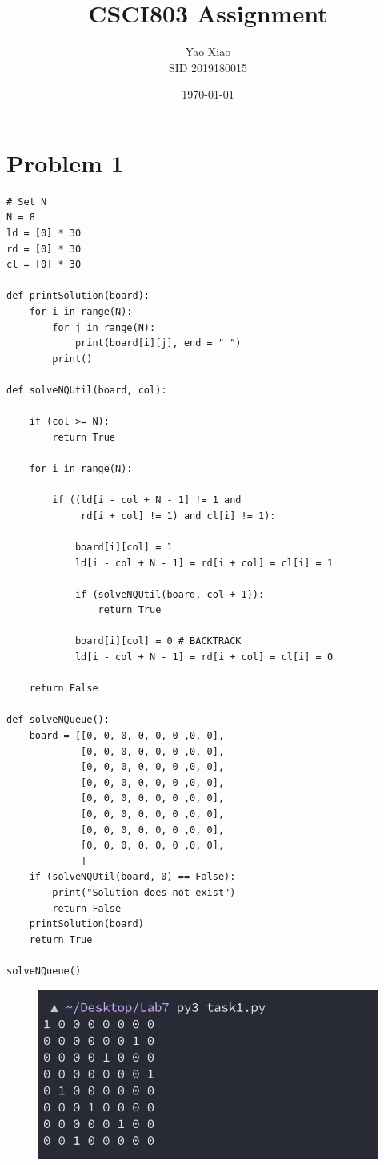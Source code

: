 \documentclass{article}
\title{CSCI803 Assignment}
\author{Yao Xiao \\ SID 2019180015}
\date{\today}
\begin{document}
\maketitle

\section{Problem 1}
\begin{lstlisting}
# Set N 
N = 8
ld = [0] * 30
rd = [0] * 30
cl = [0] * 30
  
def printSolution(board):  
    for i in range(N): 
        for j in range(N): 
            print(board[i][j], end = " ") 
        print()  
  
def solveNQUtil(board, col):  
      
    if (col >= N): 
        return True
          
    for i in range(N): 
          
        if ((ld[i - col + N - 1] != 1 and 
             rd[i + col] != 1) and cl[i] != 1): 
                   
            board[i][col] = 1
            ld[i - col + N - 1] = rd[i + col] = cl[i] = 1
              
            if (solveNQUtil(board, col + 1)): 
                return True
                  
            board[i][col] = 0 # BACKTRACK  
            ld[i - col + N - 1] = rd[i + col] = cl[i] = 0
              
    return False
      
def solveNQueue(): 
    board = [[0, 0, 0, 0, 0, 0 ,0, 0],  
             [0, 0, 0, 0, 0, 0 ,0, 0], 
             [0, 0, 0, 0, 0, 0 ,0, 0], 
             [0, 0, 0, 0, 0, 0 ,0, 0],
             [0, 0, 0, 0, 0, 0 ,0, 0],
             [0, 0, 0, 0, 0, 0 ,0, 0],
             [0, 0, 0, 0, 0, 0 ,0, 0],
             [0, 0, 0, 0, 0, 0 ,0, 0],
             ] 
    if (solveNQUtil(board, 0) == False): 
        print("Solution does not exist") 
        return False
    printSolution(board) 
    return True
      
solveNQueue()
\end{lstlisting}

\begin{figure}[H]
    \includegraphics[width=1\textwidth]{Fig1}
\end{figure}
\end{document}
